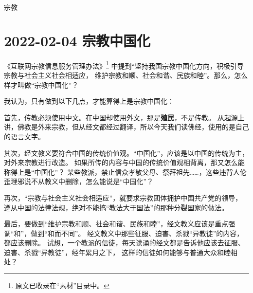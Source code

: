 \begin{taged}{宗教}
\section{2022-02-04 宗教中国化}
\end{taged}

《互联网宗教信息服务管理办法》\footnote{原文已收录在“素材”目录中。} 中提到“坚持我国宗教中国化方向，积极引导宗教与社会主义社会相适应，
维护宗教和顺、社会和谐、民族和睦”。那么，怎么样才叫做“宗教中国化”？

我认为，只有做到以下几点，才能算得上是宗教中国化：

首先，传教必须使用中文。在中国却使用外文，那是\textbf{\color{red}殖民}，不是传教。
从起源上讲，佛教是外来宗教，但从经文都经过翻译，所以今天我们读佛经，使用的是自己的语言文字。

其次，经文教义要符合中国的传统价值观。“中国化”，应该是以中国的传统为主，对外来宗教进行改造。
如果所传的内容与中国的传统价值观相背离，那又怎么能称得上是“中国化”？
某些教派，禁止信众孝敬父母、祭拜祖先……，这些违背人伦歪理邪说不从教义中删除，怎么能说是“中国化”？

再次，“宗教与社会主义社会相适应”，就要求宗教团体拥护中国共产党的领导，
遵从中国的法律法规，绝对不能搞“教法大于国法”的那种分裂国家的做法。

最后，要做到“维护宗教和顺、社会和谐、民族和睦”，经文教义应该是重点强调“和”，做到“和而不同”。
经文教义中那些征服、迫害、杀戮“异教徒”的内容，都应该删除。
试想，一个教派的信徒，每天读诵的经文都是告诉他应该去征服、迫害、杀戮“异教徒”，经年累月之下，
这样的信徒如何能够与普通大众和睦相处？

